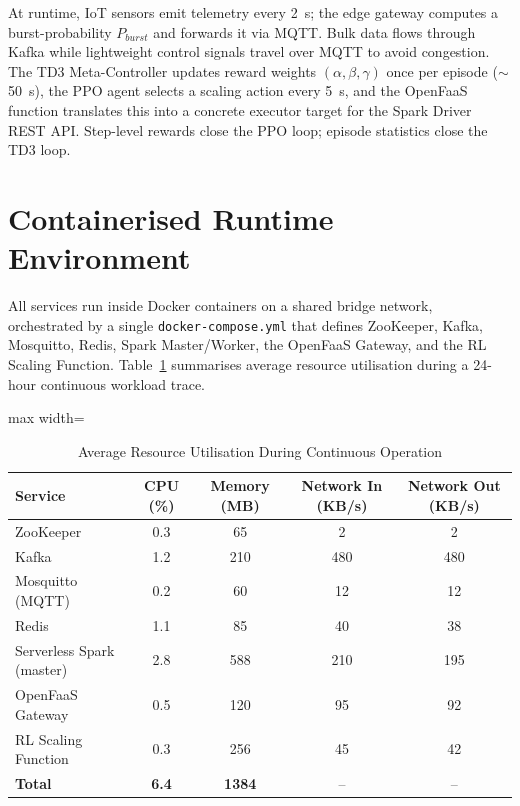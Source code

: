 \noindent At runtime, IoT sensors emit telemetry every 2~s; the edge gateway computes
a burst-probability $P_{burst}$ and forwards it via MQTT. Bulk data flows through Kafka
while lightweight control signals travel over MQTT to avoid congestion. The TD3
Meta-Controller updates reward weights $(\alpha,\beta,\gamma)$ once per episode
($\sim$50~s), the PPO agent selects a scaling action every 5~s, and the OpenFaaS
function translates this into a concrete executor target for the Spark Driver REST API.
Step-level rewards close the PPO loop; episode statistics close the TD3 loop.

\section{Containerised Runtime Environment}
\label{sec:containers}
All services run inside Docker containers on a shared bridge network, orchestrated by a
single \texttt{docker-compose.yml} that defines ZooKeeper, Kafka, Mosquitto, Redis,
Spark Master/Worker, the OpenFaaS Gateway, and the RL Scaling Function.
Table~\ref{tab:resource_usage} summarises average resource utilisation during a 24-hour
continuous workload trace.

\begin{table}[H]
\centering
\caption{Average Resource Utilisation During Continuous Operation}
\label{tab:resource_usage}
\begin{adjustbox}{max width=\textwidth}
\begin{tabular}{lcccc}
\toprule
\textbf{Service}          & \textbf{CPU (\%)} & \textbf{Memory (MB)} &
  \textbf{Network In (KB/s)} & \textbf{Network Out (KB/s)} \\
\midrule
ZooKeeper                 & 0.3  & 65   & 2   & 2  \\
Kafka                     & 1.2  & 210  & 480 & 480 \\
Mosquitto (MQTT)          & 0.2  & 60   & 12  & 12  \\
Redis                     & 1.1  & 85   & 40  & 38  \\
Serverless Spark (master) & 2.8  & 588  & 210 & 195 \\
OpenFaaS Gateway          & 0.5  & 120  & 95  & 92  \\
RL Scaling Function       & 0.3  & 256  & 45  & 42  \\
\midrule
\textbf{Total}            & \textbf{6.4} & \textbf{1384} & -- & -- \\
\bottomrule
\end{tabular}
\end{adjustbox}
\end{table}

